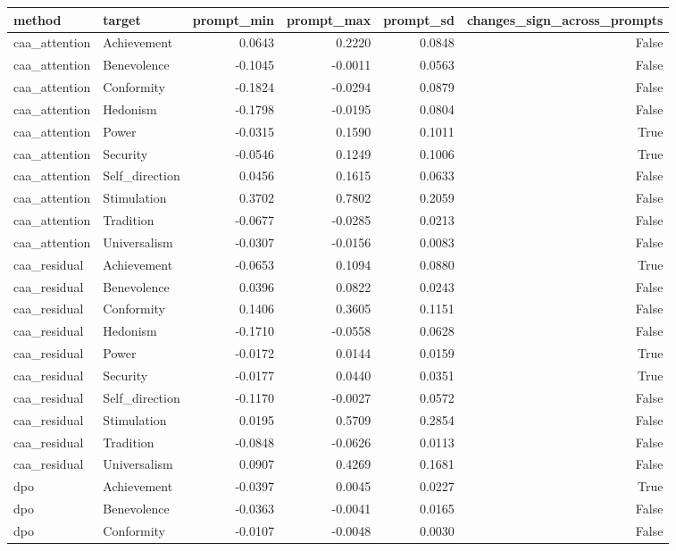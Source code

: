\begin{tabular}{llrrrr}
\toprule
method & target & prompt\_min & prompt\_max & prompt\_sd & changes\_sign\_across\_prompts \\
\midrule
caa\_attention & Achievement & 0.0643 & 0.2220 & 0.0848 & False \\
caa\_attention & Benevolence & -0.1045 & -0.0011 & 0.0563 & False \\
caa\_attention & Conformity & -0.1824 & -0.0294 & 0.0879 & False \\
caa\_attention & Hedonism & -0.1798 & -0.0195 & 0.0804 & False \\
caa\_attention & Power & -0.0315 & 0.1590 & 0.1011 & True \\
caa\_attention & Security & -0.0546 & 0.1249 & 0.1006 & True \\
caa\_attention & Self\_direction & 0.0456 & 0.1615 & 0.0633 & False \\
caa\_attention & Stimulation & 0.3702 & 0.7802 & 0.2059 & False \\
caa\_attention & Tradition & -0.0677 & -0.0285 & 0.0213 & False \\
caa\_attention & Universalism & -0.0307 & -0.0156 & 0.0083 & False \\
caa\_residual & Achievement & -0.0653 & 0.1094 & 0.0880 & True \\
caa\_residual & Benevolence & 0.0396 & 0.0822 & 0.0243 & False \\
caa\_residual & Conformity & 0.1406 & 0.3605 & 0.1151 & False \\
caa\_residual & Hedonism & -0.1710 & -0.0558 & 0.0628 & False \\
caa\_residual & Power & -0.0172 & 0.0144 & 0.0159 & True \\
caa\_residual & Security & -0.0177 & 0.0440 & 0.0351 & True \\
caa\_residual & Self\_direction & -0.1170 & -0.0027 & 0.0572 & False \\
caa\_residual & Stimulation & 0.0195 & 0.5709 & 0.2854 & False \\
caa\_residual & Tradition & -0.0848 & -0.0626 & 0.0113 & False \\
caa\_residual & Universalism & 0.0907 & 0.4269 & 0.1681 & False \\
dpo & Achievement & -0.0397 & 0.0045 & 0.0227 & True \\
dpo & Benevolence & -0.0363 & -0.0041 & 0.0165 & False \\
dpo & Conformity & -0.0107 & -0.0048 & 0.0030 & False \\

\end{tabular}

